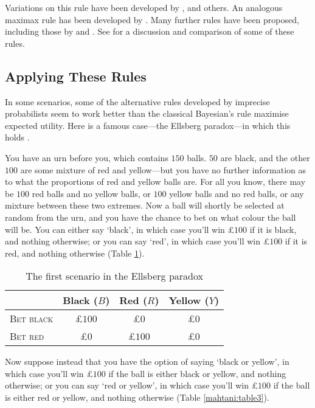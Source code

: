 Variations on this rule have been developed by \citet{gardenforssahlin1982,gilboaschmeidler1989}, and others. An analogous maximax rule has been developed by \citet{satialave1973}. Many further rules have been proposed, including those by \citet{arrowhurwicz1972} and \citet{Ellsberg1961}. See \citet{Troffaes2007} for a discussion and comparison of some of these rules. 


\subsection{Applying These Rules}

In some scenarios, some of the alternative rules developed by imprecise probabilists seem to work better than the classical Bayesian's rule maximise expected utility. Here is a famous case---the Ellsberg paradox---in which this holds \citep{Ellsberg1961}.
 
You have an urn before you, which contains $150$ balls. $50$ are black, and the other $100$ are some mixture of red and yellow---but you have no further information as to what the proportions of red and yellow balls are. For all you know, there may be $100$ red balls and no yellow balls, or $100$ yellow balls and no red balls, or any mixture between these two extremes. Now a ball will shortly be selected at random from the urn, and you have the chance to bet on what colour the ball will be. You can either say `black', in which case you'll win £$100$ if it is black, and nothing otherwise; or you can say `red', in which case you'll win £$100$ if it is red, and nothing otherwise (Table \ref{mahtani:table2}). 

\begin{table}[ht]
\centering
  \begin{tabular}{lccc}
    \hline
                       & Black ($B$) & Red ($R$) & Yellow ($Y$) \\\hline\hline
    \textsc{Bet black} & £$100$ & £$0$ & £$0$\\
    \textsc{Bet red}   & £$0$ & £$100$ & £$0$\\ 
    \hline
  \end{tabular}
\caption{The first scenario in the Ellsberg paradox}
\label{mahtani:table2}
\end{table}

Now suppose instead that you have the option of saying `black or yellow', in which case you'll win £$100$ if the ball is either black or yellow, and nothing otherwise; or you can say `red or yellow', in which case you'll win £$100$ if the ball is either red or yellow, and nothing otherwise (Table \ref{mahtani:table3}).

